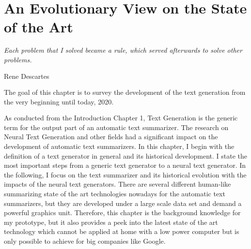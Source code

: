 \chapter{An Evolutionary View on the State of the Art}\label{ch:sota}

\epigraph{\textit{Each problem that I solved became a rule, which served afterwards to solve other problems.}}{Rene Descartes}

The goal of this chapter is to survey the development of the text generation from the very beginning until today, 2020. 

As conducted from the Introduction Chapter 1, Text Generation is the generic term for the output part of an automatic text summarizer. The research on Neural Text Generation and other fields had a significant impact on the development of automatic text summarizers. In this chapter, I begin with the definition of a text generator in general and its historical development. I state the most important steps from a generic text generator to a neural text generator. In the following, I focus on the text summarizer and its historical evolution with the impacts of the neural text generators. There are several different human-like summarizing state of the art technologies nowadays for the automatic text summarizers, but they are developed under a large scale data set and demand a powerful graphics unit. Therefore, this chapter is the background knowledge for my prototype, but it also provides a peek into the latest state of the art technology which cannot be applied at home with a low power computer but is only possible to achieve for big companies like Google.


